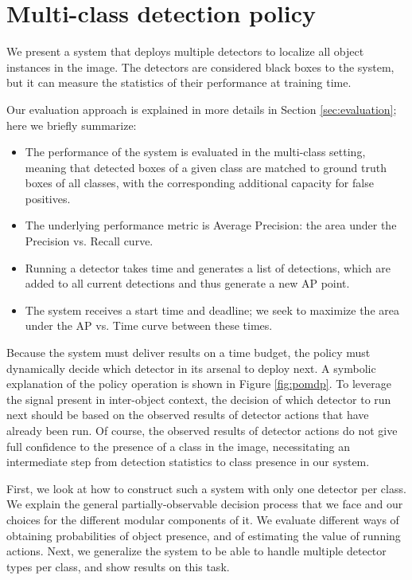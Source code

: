 \section{Multi-class detection policy}
We present a system that deploys multiple detectors to localize all object instances in the image.
The detectors are considered black boxes to the system, but it can measure the statistics of their performance at training time.

Our evaluation approach is explained in more details in Section \ref{sec:evaluation}; here we briefly summarize:
\begin{itemize}
\item The performance of the system is evaluated in the multi-class setting, meaning that detected boxes of a given class are matched to ground truth boxes of all classes, with the corresponding additional capacity for false positives.
\item The underlying performance metric is Average Precision: the area under the Precision vs. Recall curve.
\item Running a detector takes time and generates a list of detections, which are added to all current detections and thus generate a new AP point.
\item The system receives a start time and deadline; we seek to maximize the area under the AP vs. Time curve between these times.
\end{itemize}

Because the system must deliver results on a time budget, the policy must dynamically decide which detector in its arsenal to deploy next.
A symbolic explanation of the policy operation is shown in Figure \ref{fig:pomdp}.
To leverage the signal present in inter-object context, the decision of which detector to run next should be based on the observed results of detector actions that have already been run.
Of course, the observed results of detector actions do not give full confidence to the presence of a class in the image, necessitating an intermediate step from detection statistics to class presence in our system.

First, we look at how to construct such a system with only one detector per class.
We explain the general partially-observable decision process that we face and our choices for the different modular components of it.
We evaluate different ways of obtaining probabilities of object presence, and of estimating the value of running actions.
Next, we generalize the system to be able to handle multiple detector types per class, and show results on this task.

